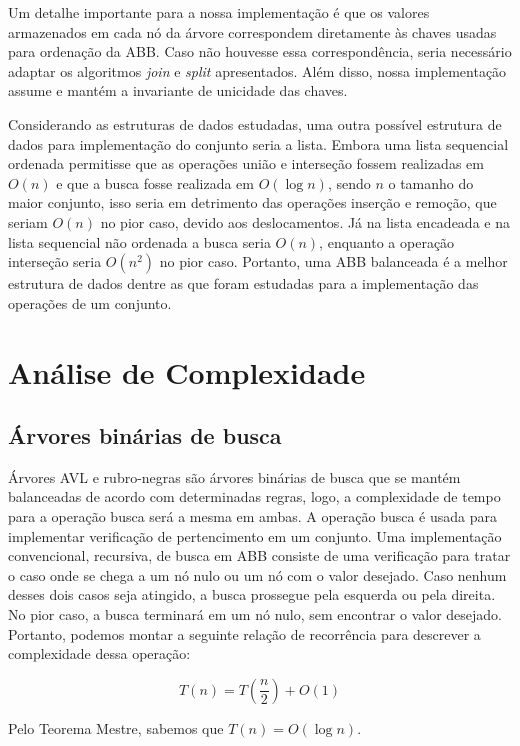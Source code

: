 \documentclass[a4paper,12pt]{report}
\begin{document}
Um detalhe importante para a nossa implementação é que os valores armazenados
em cada nó da árvore correspondem diretamente às chaves usadas para ordenação
da ABB. Caso não houvesse essa correspondência, seria necessário adaptar os
algoritmos \textit{join} e \textit{split} apresentados. Além disso, nossa 
implementação assume e mantém a invariante de unicidade das chaves.

Considerando as estruturas de dados estudadas, uma outra possível estrutura
de dados para implementação do conjunto seria a lista. Embora uma lista sequencial
ordenada permitisse que as operações união e interseção fossem realizadas 
em $O(n)$ e que a busca fosse realizada em $O(\log n)$, sendo $n$ o tamanho 
do maior conjunto, isso seria em detrimento das operações inserção e remoção,
que seriam $O(n)$ no pior caso, devido aos deslocamentos. Já na lista encadeada
e na lista sequencial não ordenada a busca seria $O(n)$, enquanto a operação 
interseção seria $O(n^2)$ no pior caso. Portanto, uma ABB balanceada é a melhor 
estrutura de dados dentre as que foram estudadas para a implementação das operações
de um conjunto.

\section*{Análise de Complexidade}

\subsection*{Árvores binárias de busca}

Árvores AVL e rubro-negras são árvores binárias de busca que se mantém 
balanceadas de acordo com determinadas regras, logo, a complexidade
de tempo para a operação busca será a mesma em ambas. A operação busca é
usada para implementar verificação de pertencimento em um conjunto. Uma 
implementação convencional, recursiva, de busca em ABB consiste de uma
verificação para tratar o caso onde se chega a um nó nulo ou um nó com o valor
desejado. Caso nenhum desses dois casos seja atingido, a busca prossegue pela
esquerda ou pela direita. No pior caso, a busca terminará em um nó nulo, sem
encontrar o valor desejado. Portanto, podemos montar a seguinte relação de 
recorrência para descrever a complexidade dessa operação:

\[
                      T(n) = T\left(\frac{n}{2}\right) + O(1)
\]

Pelo Teorema Mestre, sabemos que $T(n) = O(\log n)$.
\end{document}
